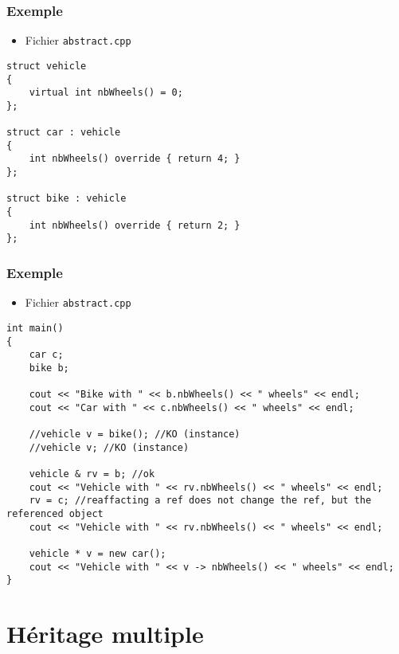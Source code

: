 \begin{frame}[containsverbatim]
\frametitle{Exemple}
\begin{itemize}
\item Fichier \texttt{abstract.cpp}
\end{itemize}
\begin{lstlisting}
struct vehicle
{		
	virtual int nbWheels() = 0;
};

struct car : vehicle
{
	int nbWheels() override { return 4; }
};

struct bike : vehicle
{
	int nbWheels() override { return 2; }
};
\end{lstlisting}
\end{frame}

\begin{frame}[containsverbatim]
\frametitle{Exemple}
\begin{itemize}
\item Fichier \texttt{abstract.cpp}
\end{itemize}
\begin{lstlisting}
int main()
{
	car c;
	bike b;		

	cout << "Bike with " << b.nbWheels() << " wheels" << endl;
	cout << "Car with " << c.nbWheels() << " wheels" << endl;

	//vehicle v = bike(); //KO (instance)
	//vehicle v; //KO (instance)
	
	vehicle & rv = b; //ok
	cout << "Vehicle with " << rv.nbWheels() << " wheels" << endl;
	rv = c; //reaffacting a ref does not change the ref, but the referenced object
	cout << "Vehicle with " << rv.nbWheels() << " wheels" << endl;

	vehicle * v = new car();
	cout << "Vehicle with " << v -> nbWheels() << " wheels" << endl;
}
\end{lstlisting}
\end{frame}

\section{Héritage multiple}


